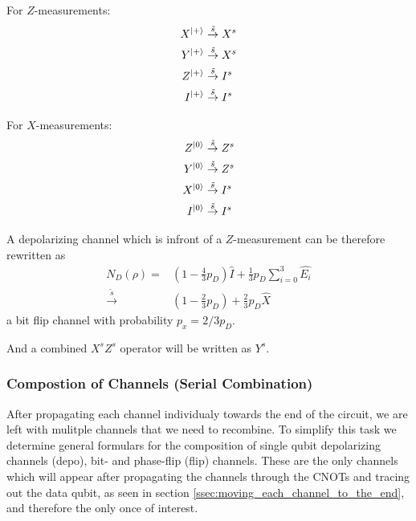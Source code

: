 For $Z$-measurements:
\begin{align*}
    X^{\ket{+}} & \overset{\tilde{s}}{\rightarrow} X^{s} \\
    Y^{\ket{+}} & \overset{\tilde{s}}{\rightarrow} X^{s} \\
    Z^{\ket{+}} & \overset{\tilde{s}}{\rightarrow} I^{s} \\
    I^{\ket{+}} & \overset{\tilde{s}}{\rightarrow} I^{s} \\
\end{align*}

For $X$-measurements:
\begin{align*}
    Z^{\ket{0}} & \overset{\tilde{s}}{\rightarrow} Z^{s} \\
    Y^{\ket{0}} & \overset{\tilde{s}}{\rightarrow} Z^{s} \\
    X^{\ket{0}} & \overset{\tilde{s}}{\rightarrow} I^{s} \\
    I^{\ket{0}} & \overset{\tilde{s}}{\rightarrow} I^{s} \\
\end{align*}

A depolarizing channel which is infront of a $Z$-measurement can be therefore rewritten as
\begin{align*}
    N_D(\rho) = & \left( 1- \frac{4}{3} p_D\right) \hat{I} + \frac{1}{3} p_D \sum_{i=0}^3 \hat{E_i} \\
\overset{\tilde{s}}{\rightarrow} & \left(  1- \frac{2}{3}p_D\right) + \frac{2}{3} p_D \hat{X}
\end{align*}
a bit flip channel with probability $p_x = 2/3 p_D$.

And a combined $X^sZ^s$ operator will be written as $Y^s$.


\subsubsection{Compostion of Channels (Serial Combination)}\label{sssec:composition_of_channels}

After propagating each channel individualy towards the end of the circuit, we are left with mulitple channels that we need to recombine.
To simplify this task we determine general formulars for the composition of single qubit depolarizing channels (depo), bit- and phase-flip (flip) channels.
These are the only channels which will appear after propagating the channels through the CNOTs and tracing out the data qubit, as seen in section \ref{ssec:moving_each_channel_to_the_end},
and therefore the only once of interest. 

